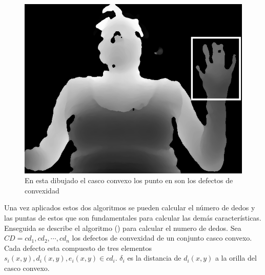 \begin{figure}[!h]
\begin{center}
\includegraphics[scale=.5]{./Figures/roi.png}
\end{center}
\caption{En esta dibujado el casco convexo los punto en son los defectos de convexidad}
\label{fig:Convex&Defects}
\end{figure}


Una vez aplicados estos dos algoritmos se pueden calcular el número de dedos y las puntas de estos que son fundamentales para calcular las demás características. Enseguida se describe el algoritmo () para calcular el numero de dedos. 
Sea $CD={cd_1, cd_2, \cdots, cd_n}$ los defectos de convexidad de un conjunto casco convexo. Cada defecto esta compuesto de tres elementos $s_i(x,y),d_i(x,y),e_i(x,y) \in cd_i$. $\delta_i$ es la distancia de $d_i(x,y)$ a la orilla del casco convexo.  

